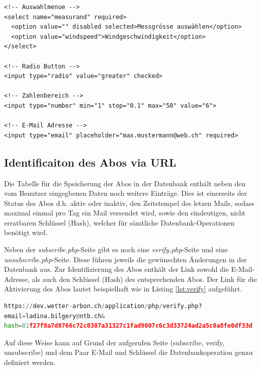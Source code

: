 \begin{lstlisting}[label=lst:HTML5form,caption=Integrierte Formularüberprüfung mit HTML5, language=HTML5, style=htmlcssjs]
<!-- Auswahlmenue -->
<select name="measurand" required>
  <option value="" disabled selected>Messgrösse auswählen</option>
  <option value="windspeed">Windgeschwindigkeit</option>
</select>

<!-- Radio Button -->
<input type="radio" value="greater" checked>

<!-- Zahlenbereich -->
<input type="number" min="1" step="0.1" max="50" value="6">

<!-- E-Mail Adresse -->
<input type="email" placeholder="max.mustermann@web.ch" required>
\end{lstlisting}



\subsection{Identificaiton des Abos via URL}
Die Tabelle für die Speicherung der Abos in der Datenbank enthält neben den vom Benutzer eingegbenen Daten noch weitere Einträge. Dies ist einerseits der Status des Abos d.h. aktiv oder inaktiv, den Zeitstempel des letzen Mails, sodass maximal einmal pro Tag ein Mail versendet wird, sowie den eindeutigen, nicht erratbaren Schlüssel (Hash), welcher für sämtliche Datenbank-Operationen benötigt wird.


Neben der \textit{subscribe.php}-Seite gibt es noch eine \textit{verify.php}-Seite und eine \textit{unsubscribe.php}-Seite. Diese führen jeweils die gewünschten Änderungen in der Datenbank aus. Zur Identifizierung des Abos enthält der Link sowohl die E-Mail-Adresse, als auch den Schlüssel (Hash) des entsprechenden Abos. Der Link für die Aktivierung des Abos lautet beispielhaft wie in Listing \ref{lst:verify} aufgeführt.

\begin{lstlisting}[label=lst:verify,caption=Beispiellink für die Aktivierung eines Abos, language=Python, style=py]
https://dev.wetter-arbon.ch/application/php/verify.php?
email=ladina.bilgery@ntb.ch&
hash=81f27f8a7d8766c72c0307a31327c1fad9007c6c3d33724ad2a5c0a8fe0df33d
\end{lstlisting}

Auf diese Weise kann auf Grund der aufgerufen Seite (subscribe, verify, unsubscribe) und dem Paar E-Mail und Schlüssel die Datenbankoperation genau definiert werden.
